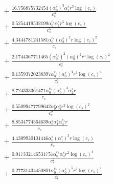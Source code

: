 \documentclass[10pt]{article}
\begin{document}
\begin{align*}
&{}  + \frac{16.756875732454 \left(\alpha_{0}^s\right)^{3} \alpha_{1}^s r^{3} \log{\left(c_{s} \right)}}{c_{s}^{3}} \\
&{}  + \frac{0.5254419502199 \alpha_{0}^{c_s} \alpha_{1}^s r^{5} \log{\left(c_{s} \right)}}{c_{s}^{5}} \\
&{}  + \frac{4.3444781241581 \alpha_{0}^{c_s} \left(\alpha_{2}^s\right)^{2} r \log{\left(c_{s} \right)}^{2}}{c_{s}} \\
&{}  + \frac{2.1744367711465 \left(\alpha_{0}^{c_s}\right)^{2} \left(\alpha_{0}^s\right)^{2} r^{4} \log{\left(c_{s} \right)}^{2}}{c_{s}^{4}} \\
&{}  + \frac{0.13593720238397 \alpha_{0}^{c_s} \left(\alpha_{0}^s\right)^{4} r^{3} \log{\left(c_{s} \right)}^{4}}{c_{s}^{3}} \\
&{}  + \frac{8.724333361471 \alpha_{0}^{c_s} \left(\alpha_{0}^s\right)^{3} \alpha_{2}^s r}{c_{s}} \\
&{}  + \frac{0.55099477799642 \alpha_{0}^s \alpha_{4}^s r^{2} \log{\left(c_{s} \right)}^{2}}{c_{s}^{2}} \\
&{}  + \frac{8.8534774364639 \alpha_{0}^s \alpha_{1}^s \alpha_{3}^{c_s} r}{c_{s}} \\
&{}  + \frac{4.4309930101446 \alpha_{0}^s \left(\alpha_{1}^s\right)^{3} r \log{\left(c_{s} \right)}}{c_{s}} \\
&{}  + \frac{0.017332146531751 \alpha_{0}^{c_s} \alpha_{4}^s r^{2} \log{\left(c_{s} \right)}^{4}}{c_{s}^{2}} \\
&{}  + \frac{0.27731434450801 \alpha_{0}^{c_s} \left(\alpha_{0}^s\right)^{5} r^{2} \log{\left(c_{s} \right)}^{4}}{c_{s}^{2}}
\end{align*}
\end{document}

